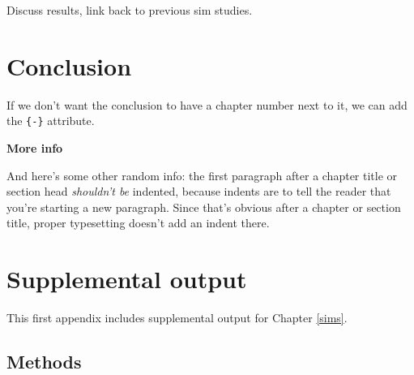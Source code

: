 \documentclass[12pt, twoside]{amherstthesis}
\begin{document}
Discuss results, link back to previous sim studies.

\hypertarget{conclusion}{%
\chapter*{Conclusion}\label{conclusion}}

If we don't want the conclusion to have a chapter number next to it, we can add the \texttt{\{-\}} attribute.

\textbf{More info}

And here's some other random info: the first paragraph after a chapter title or section head \emph{shouldn't be} indented, because indents are to tell the reader that you're starting a new paragraph. Since that's obvious after a chapter or section title, proper typesetting doesn't add an indent there.

\appendix

\hypertarget{appa}{%
\chapter{Supplemental output}\label{appa}}

This first appendix includes supplemental output for Chapter \ref{sims}.

\hypertarget{suppmethods}{%
\section{Methods}\label{suppmethods}}
\end{document}
